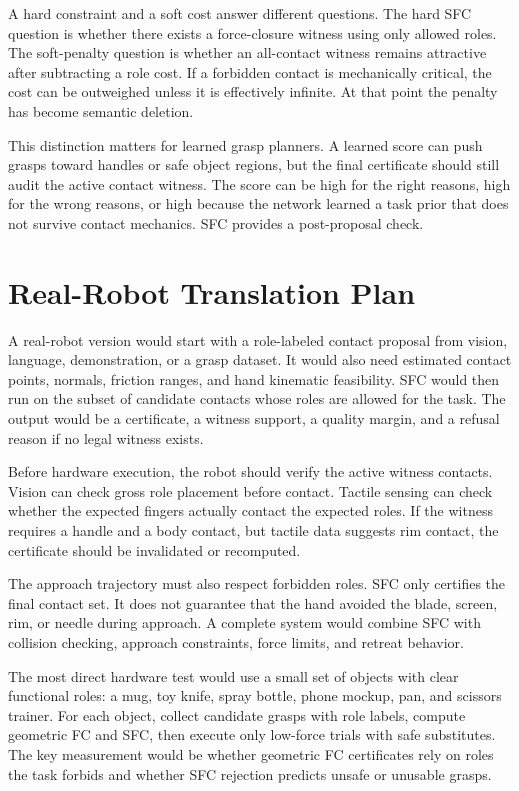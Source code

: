 \documentclass{article}
\begin{document}
A hard constraint and a soft cost answer different questions. The hard SFC question is whether there exists a force-closure witness using only allowed roles. The soft-penalty question is whether an all-contact witness remains attractive after subtracting a role cost. If a forbidden contact is mechanically critical, the cost can be outweighed unless it is effectively infinite. At that point the penalty has become semantic deletion.

This distinction matters for learned grasp planners. A learned score can push grasps toward handles or safe object regions, but the final certificate should still audit the active contact witness. The score can be high for the right reasons, high for the wrong reasons, or high because the network learned a task prior that does not survive contact mechanics. SFC provides a post-proposal check.

\section{Real-Robot Translation Plan}

A real-robot version would start with a role-labeled contact proposal from vision, language, demonstration, or a grasp dataset. It would also need estimated contact points, normals, friction ranges, and hand kinematic feasibility. SFC would then run on the subset of candidate contacts whose roles are allowed for the task. The output would be a certificate, a witness support, a quality margin, and a refusal reason if no legal witness exists.

Before hardware execution, the robot should verify the active witness contacts. Vision can check gross role placement before contact. Tactile sensing can check whether the expected fingers actually contact the expected roles. If the witness requires a handle and a body contact, but tactile data suggests rim contact, the certificate should be invalidated or recomputed.

The approach trajectory must also respect forbidden roles. SFC only certifies the final contact set. It does not guarantee that the hand avoided the blade, screen, rim, or needle during approach. A complete system would combine SFC with collision checking, approach constraints, force limits, and retreat behavior.

The most direct hardware test would use a small set of objects with clear functional roles: a mug, toy knife, spray bottle, phone mockup, pan, and scissors trainer. For each object, collect candidate grasps with role labels, compute geometric FC and SFC, then execute only low-force trials with safe substitutes. The key measurement would be whether geometric FC certificates rely on roles the task forbids and whether SFC rejection predicts unsafe or unusable grasps.
\end{document}
